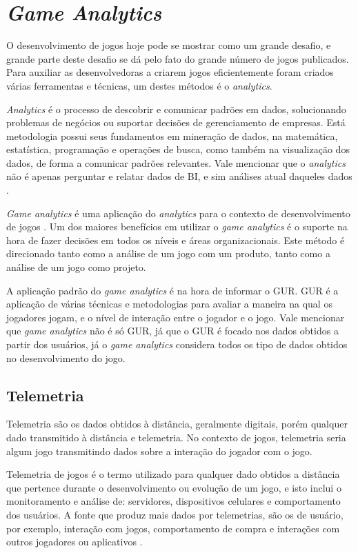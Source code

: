 \section{\textit{Game Analytics}}
O desenvolvimento de jogos hoje pode se mostrar como um grande desafio, e grande parte deste desafio se dá pelo fato do grande número de jogos publicados. Para auxiliar as desenvolvedoras a criarem jogos eficientemente foram criados várias ferramentas e técnicas, um destes métodos é o \textit{analytics}.

\textit{Analytics} é o processo de descobrir e comunicar padrões em dados, solucionando problemas de negócios ou suportar decisões de gerenciamento de empresas. Está metodologia possui seus fundamentos em mineração de dados, na matemática, estatística, programação e operações de busca, como também na visualização dos dados, de forma a comunicar padrões relevantes. Vale mencionar que o \textit{analytics} não é apenas perguntar e relatar dados de BI, e sim análises atual daqueles dados \cite{analytics}. 

\textit{Game analytics} é uma aplicação do \textit{analytics} para o contexto de desenvolvimento de jogos \cite{game_analytics}. Um dos maiores benefícios em utilizar o \textit{game analytics} é o suporte na hora de fazer decisões em todos os níveis e áreas organizacionais. Este método é direcionado tanto como a análise de um jogo com um produto, tanto como a análise de um jogo como projeto.

A aplicação padrão do \textit{game analytics} é na hora de informar o GUR. GUR é a aplicação de várias técnicas e metodologias para avaliar a maneira na qual os jogadores jogam, e o nível de interação entre o jogador e o jogo. Vale mencionar que \textit{game analytics} não é só GUR, já que o GUR é focado nos dados obtidos a partir dos usuários, já o \textit{game analytics} considera todos os tipo de dados obtidos no desenvolvimento do jogo.
\subsection{Telemetria}
Telemetria são os dados obtidos à distância, geralmente digitais, porém qualquer dado transmitido à distância e telemetria. No contexto de jogos, telemetria seria algum jogo transmitindo dados sobre a interação do jogador com o jogo.

Telemetria de jogos é o termo utilizado para qualquer dado obtidos a distância que pertence durante o desenvolvimento ou evolução de um jogo, e isto inclui o monitoramento e análise de: servidores, dispositivos celulares e comportamento dos usuários. A fonte que produz mais dados por telemetrias, são os de usuário, por exemplo, interação com jogos, comportamento de compra e interações com outros jogadores ou aplicativos \cite{telemetry}.
